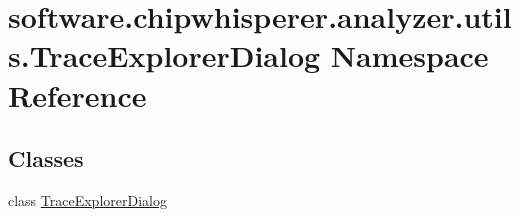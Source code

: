 \hypertarget{namespacesoftware_1_1chipwhisperer_1_1analyzer_1_1utils_1_1TraceExplorerDialog}{}\section{software.\+chipwhisperer.\+analyzer.\+utils.\+Trace\+Explorer\+Dialog Namespace Reference}
\label{namespacesoftware_1_1chipwhisperer_1_1analyzer_1_1utils_1_1TraceExplorerDialog}
\subsection*{Classes}
\begin{DoxyCompactItemize}
\item 
class \hyperlink{classsoftware_1_1chipwhisperer_1_1analyzer_1_1utils_1_1TraceExplorerDialog_1_1TraceExplorerDialog}{Trace\+Explorer\+Dialog}
\end{DoxyCompactItemize}
